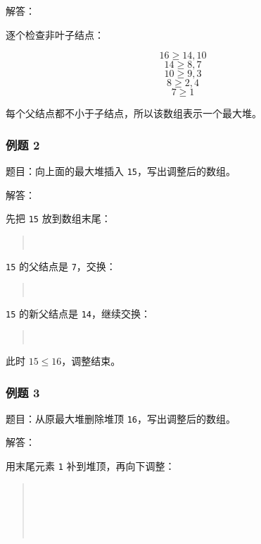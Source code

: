 \documentclass[UTF8,zihao=-4]{ctexart}
\begin{document}
解答：

逐个检查非叶子结点：

\[16 \ge  14, 10\]
\[14 \ge  8, 7\]
\[10 \ge  9, 3\]
\[8 \ge  2, 4\]
\[7 \ge  1\]

每个父结点都不小于子结点，所以该数组表示一个最大堆。

\subsubsection*{例题 2}

题目：向上面的最大堆插入 \texttt{15}，写出调整后的数组。

解答：

先把 \texttt{15} 放到数组末尾：

\begin{quote}
\small\ttfamily\raggedright
\relax [16,\ 14,\ 10,\ 8,\ 7,\ 9,\ 3,\ 2,\ 4,\ 1,\ 15]\\
\end{quote}

\texttt{15} 的父结点是 \texttt{7}，交换：

\begin{quote}
\small\ttfamily\raggedright
\relax [16,\ 14,\ 10,\ 8,\ 15,\ 9,\ 3,\ 2,\ 4,\ 1,\ 7]\\
\end{quote}

\texttt{15} 的新父结点是 \texttt{14}，继续交换：

\begin{quote}
\small\ttfamily\raggedright
\relax [16,\ 15,\ 10,\ 8,\ 14,\ 9,\ 3,\ 2,\ 4,\ 1,\ 7]\\
\end{quote}

此时 $15 \le 16$，调整结束。

\subsubsection*{例题 3}

题目：从原最大堆删除堆顶 \texttt{16}，写出调整后的数组。

解答：

用末尾元素 \texttt{1} 补到堆顶，再向下调整：

\begin{quote}
\small\ttfamily\raggedright
\relax [1,\ 14,\ 10,\ 8,\ 7,\ 9,\ 3,\ 2,\ 4]\\
\relax [14,\ 1,\ 10,\ 8,\ 7,\ 9,\ 3,\ 2,\ 4]\\
\relax [14,\ 8,\ 10,\ 1,\ 7,\ 9,\ 3,\ 2,\ 4]\\
\relax [14,\ 8,\ 10,\ 4,\ 7,\ 9,\ 3,\ 2,\ 1]\\
\end{quote}
\end{document}
